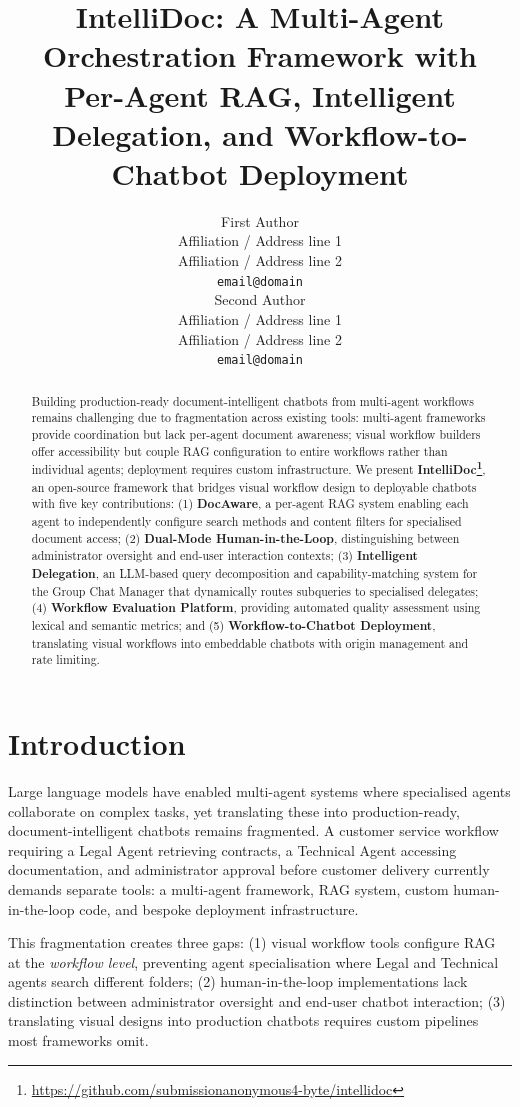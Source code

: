 \documentclass[11pt]{article}
\title{IntelliDoc: A Multi-Agent Orchestration Framework with\\Per-Agent RAG, Intelligent Delegation, and Workflow-to-Chatbot Deployment}
\author{First Author \\
  Affiliation / Address line 1 \\
  Affiliation / Address line 2 \\
  \texttt{email@domain} \\\And
  Second Author \\
  Affiliation / Address line 1 \\
  Affiliation / Address line 2 \\
  \texttt{email@domain} \\}
\begin{document}
\maketitle

\begin{abstract}
Building production-ready document-intelligent chatbots from multi-agent workflows remains challenging due to fragmentation across existing tools: multi-agent frameworks provide coordination but lack per-agent document awareness; visual workflow builders offer accessibility but couple RAG configuration to entire workflows rather than individual agents; deployment requires custom infrastructure. We present \textbf{IntelliDoc\footnote{\url{https://github.com/submissionanonymous4-byte/intellidoc}}}, an open-source framework that bridges visual workflow design to deployable chatbots with five key contributions: (1) \textbf{DocAware}, a per-agent RAG system enabling each agent to independently configure search methods and content filters for specialised document access; (2) \textbf{Dual-Mode Human-in-the-Loop}, distinguishing between administrator oversight and end-user interaction contexts; (3) \textbf{Intelligent Delegation}, an LLM-based query decomposition and capability-matching system for the Group Chat Manager that dynamically routes subqueries to specialised delegates; (4) \textbf{Workflow Evaluation Platform}, providing automated quality assessment using lexical and semantic metrics; and (5) \textbf{Workflow-to-Chatbot Deployment}, translating visual workflows into embeddable chatbots with origin management and rate limiting.
\end{abstract}

\section{Introduction}

Large language models have enabled multi-agent systems where specialised agents collaborate on complex tasks, yet translating these into production-ready, document-intelligent chatbots remains fragmented. A customer service workflow requiring a Legal Agent retrieving contracts, a Technical Agent accessing documentation, and administrator approval before customer delivery currently demands separate tools: a multi-agent framework, RAG system, custom human-in-the-loop code, and bespoke deployment infrastructure.

This fragmentation creates three gaps: (1) visual workflow tools configure RAG at the \textit{workflow level}, preventing agent specialisation where Legal and Technical agents search different folders; (2) human-in-the-loop implementations lack distinction between administrator oversight and end-user chatbot interaction; (3) translating visual designs into production chatbots requires custom pipelines most frameworks omit.
\end{document}
